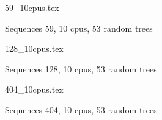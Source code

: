 \documentclass[12pt,a4paper]{article}
\begin{document}
 
\begin{figure}
\caption*{Sequences 59, 10 cpus, 53 random trees}
{59_10cpus.tex}
\end{figure}

 
\begin{figure}
\caption*{Sequences 128, 10 cpus, 53 random trees}
{128_10cpus.tex}
\end{figure}

 
\begin{figure}
\caption*{Sequences 404, 10 cpus, 53 random trees}
{404_10cpus.tex}
\end{figure}
\end{document}
